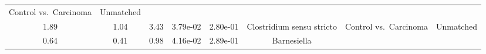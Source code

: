 \documentclass[12pt,]{article}
\begin{document}
\begin{longtable}[]{@{}cccccccc@{}}
\begin{minipage}[t]{0.14\columnwidth}
Control vs.~Carcinoma\strut
\end{minipage} & \begin{minipage}[t]{0.09\columnwidth}\centering\strut
Unmatched\strut
\end{minipage}\tabularnewline
\begin{minipage}[t]{0.05\columnwidth}\centering\strut
1.89\strut
\end{minipage} & \begin{minipage}[t]{0.09\columnwidth}\centering\strut
1.04\strut
\end{minipage} & \begin{minipage}[t]{0.09\columnwidth}\centering\strut
3.43\strut
\end{minipage} & \begin{minipage}[t]{0.07\columnwidth}\centering\strut
3.79e-02\strut
\end{minipage} & \begin{minipage}[t]{0.07\columnwidth}\centering\strut
2.80e-01\strut
\end{minipage} & \begin{minipage}[t]{0.20\columnwidth}\centering\strut
Clostridium sensu stricto\strut
\end{minipage} & \begin{minipage}[t]{0.14\columnwidth}\centering\strut
Control vs.~Carcinoma\strut
\end{minipage} & \begin{minipage}[t]{0.09\columnwidth}\centering\strut
Unmatched\strut
\end{minipage}\tabularnewline
\begin{minipage}[t]{0.05\columnwidth}\centering\strut
0.64\strut
\end{minipage} & \begin{minipage}[t]{0.09\columnwidth}\centering\strut
0.41\strut
\end{minipage} & \begin{minipage}[t]{0.09\columnwidth}\centering\strut
0.98\strut
\end{minipage} & \begin{minipage}[t]{0.07\columnwidth}\centering\strut
4.16e-02\strut
\end{minipage} & \begin{minipage}[t]{0.07\columnwidth}\centering\strut
2.89e-01\strut
\end{minipage} & \begin{minipage}[t]{0.20\columnwidth}\centering\strut
Barnesiella\strut
\end{minipage} & \begin{minipage}[t]{0.14\columnwidth}\centering\strut

\end{minipage}
\end{longtable}
\end{document}
